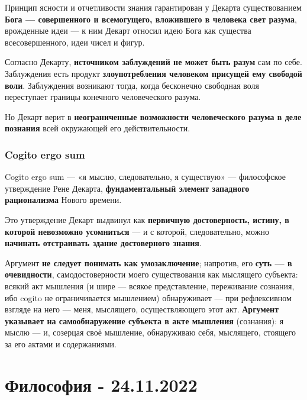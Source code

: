 \documentclass{article}
\begin{document}
\begin{flushleft}
\hfill

Принцип ясности и отчетливости знания гарантирован у Декарта существованием \textbf{Бога — совершенного и всемогущего, вложившего в человека свет разума}, врожденные идеи — к ним Декарт относил идею Бога как существа всесовершенного, идеи чисел и фигур.

\hfill

Согласно Декарту, \textbf{источником заблуждений не может быть разум} сам по себе. Заблуждения есть продукт \textbf{злоупотребления человеком присущей ему свободой воли}. Заблуждения возникают тогда, когда бесконечно свободная воля переступает границы конечного человеческого разума.

Но Декарт верит в \textbf{неограниченные возможности человеческого разума в деле познания} всей окружающей его действительности.

\subsubsection{Cogito ergo sum}

Cogito ergo sum — «я мыслю, следовательно, я существую» — философское утверждение Рене Декарта, \textbf{фундаментальный элемент западного рационализма} Нового времени.

\hfill

Это утверждение Декарт выдвинул как \textbf{первичную достоверность, истину, в которой невозможно усомниться} — и с которой, следовательно, можно \textbf{начинать отстраивать здание достоверного знания}.

\hfill

Аргумент \textbf{не следует понимать как умозаключение}; напротив, его \textbf{суть — в очевидности}, самодостоверности моего существования как мыслящего субъекта: всякий акт мышления (и шире — всякое представление, переживание сознания, ибо cogito не ограничивается мышлением) обнаруживает — при рефлексивном взгляде на него — меня, мыслящего, осуществляющего этот акт. \textbf{Аргумент указывает на самообнаружение субъекта в акте мышления} (сознания): я мыслю — и, созерцая своё мышление, обнаруживаю себя, мыслящего, стоящего за его актами и содержаниями.

\end{flushleft}

\section{Философия - 24.11.2022}
\end{document}

